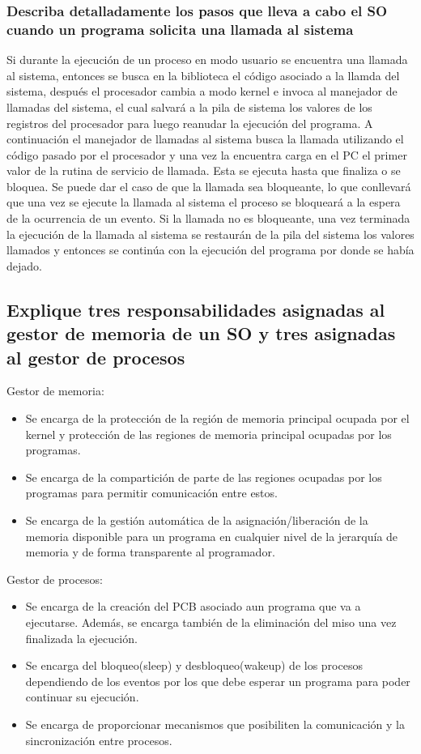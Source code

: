 \documentclass{article}
\begin{document}
				\subsubsection*{Describa detalladamente los pasos que lleva a cabo el SO cuando un programa solicita una llamada al sistema}
					Si durante la ejecución de un proceso en modo usuario se encuentra una llamada al sistema, entonces se busca en la biblioteca el código asociado a la llamda del sistema, después el procesador cambia a modo kernel e invoca al manejador de llamadas del sistema, el cual salvará a la pila de sistema los valores de los registros del procesador para luego reanudar la ejecución del programa. A continuación el manejador de llamadas al sistema busca la llamada utilizando el código pasado por el procesador y una vez la encuentra carga en el PC el primer valor de la rutina de servicio de llamada. Esta se ejecuta hasta que finaliza o se bloquea. Se puede dar el caso de que la llamada sea bloqueante, lo que conllevará que una vez se ejecute la llamada al sistema el proceso se bloqueará a la espera de la ocurrencia de un evento. Si la llamada no es bloqueante, una vez terminada la ejecución de la llamada al sistema se restaurán de la pila del sistema los valores  llamados y entonces se continúa con la ejecución del programa por donde se había dejado.
				
				\subsection[Pregunta 2]{Explique tres responsabilidades asignadas al gestor de memoria de un SO y tres asignadas al gestor de procesos}
				Gestor de memoria:
				\begin{itemize}
				\item Se encarga de la protección de la región de memoria principal ocupada por el kernel y protección de las regiones de memoria principal ocupadas por los programas.
				\item Se encarga de la compartición de parte de las regiones ocupadas por los programas para permitir comunicación entre estos.
				\item Se encarga de la gestión automática de la asignación/liberación de la memoria disponible para un programa en cualquier nivel de la jerarquía de memoria y de forma transparente al programador.
				\end{itemize}
				
				Gestor de procesos:
				\begin{itemize}
				\item Se encarga de la creación del PCB asociado aun programa que va a ejecutarse. Además, se encarga también de la eliminación del miso una vez finalizada la ejecución.
				\item Se encarga del bloqueo(sleep) y desbloqueo(wakeup) de los procesos dependiendo de los eventos por los que debe esperar un programa para poder continuar su ejecución.
				\item Se encarga de proporcionar mecanismos que posibiliten la comunicación y la sincronización entre procesos.
				\end{itemize}
				
\end{document}

